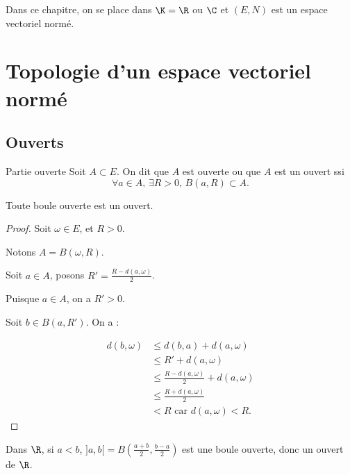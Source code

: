 Dans ce chapitre, on se place dans $\K = \R$ ou $\C$ et $(E, N)$ est un espace vectoriel normé.

\section{Topologie d'un espace vectoriel normé}

\subsection{Ouverts}

\begin{definition}{Partie ouverte}{}
    Soit $A \subset E$. On dit que $A$ est ouverte ou que $A$ est un ouvert ssi 
    $$ \forall a \in A, \, \exists R > 0, \, B(a, R) \subset A.$$
\end{definition}

\begin{propositionnt}{}{}
    Toute boule ouverte est un ouvert.
\end{propositionnt}


\begin{proof}
    Soit $\omega \in E$, et $R > 0$. 

    Notons $A = B(\omega, R)$.

    Soit $a \in A$, posons $R' = \frac{R - d(a, \omega)}{2}$. 

    Puisque $a \in A$, on a $R' > 0$.

    Soit $b \in B(a, R')$. On a : 

    \begin{align*}
        d(b, \omega) & \leqslant d(b, a) + d(a, \omega) \\
        & \leqslant R' + d(a, \omega) \\
        & \leqslant \frac{R - d(a, \omega)}{2 } + d(a, \omega) \\
        & \leqslant \frac{R + d(a, \omega)}{2} \\
        & < R \text{ car } d(a, \omega) < R.
    \end{align*}

\end{proof}

\begin{exemple}
    Dans $\R$, si $a < b$, $]a, b[ = B\left(\frac{a+b}{2}, \frac{b-a}{2}\right)$ est une boule 
    ouverte, donc un ouvert de $\R$.
\end{exemple}

